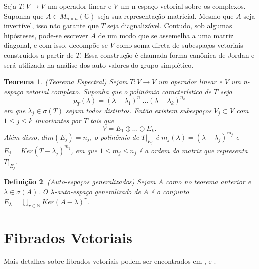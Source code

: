 \documentclass[12pt]{book}
\newtheorem{teorema}{Teorema}[section]
\newtheorem{definicao}[teorema]{Definição}
\newcommand{\complexo}[1]{\mathbb{C}^{#1}}
\newcommand{\matrizquadcomplexa}[1]{M_{#1 \times #1}(\complexo{})}
\begin{document}
	Seja $T:V\to V$ um operador linear e $V$ um n-espaço vetorial sobre os complexos. Suponha que $A \in \matrizquadcomplexa{n}$ seja sua representação matricial. Mesmo que $A$ seja invertível, isso não garante que $T$ seja diagnalizável. Contudo, sob algumas hipósteses, pode-se escrever $A$ de um modo que se assemelha a uma matriz diagonal, e com isso, decompõe-se $V$ como soma direta de subespaços vetoriais construidos a partir de $T$. Essa construção é chamada forma canônica de Jordan e será utilizada na análise dos auto-valores do grupo simplético.
	
	\begin{teorema}\label{teorema_espectral_jordan}
		(Teorema Espectral) Sejam $T:V \to V$ um operador linear e $V$ um n-espaço vetorial complexo. Suponha que o polinômio característico de $T$ seja
		$$
		p_{T}(\lambda) = (\lambda - \lambda_{1})^{n_{1}}\dots (\lambda - \lambda_{k})^{n_{k}}
		$$
		em que $\lambda_{j} \in \sigma(T)$ sejam todos distintos. Então existem subespaços $V_{j} \subset V$ com $1\leq j \leq k$ invariantes por $T$ tais que 
		$$
		V = E_{1}\oplus \dots \oplus E_{k}.
		$$
		Além disso, $dim(E_{j}) = n_{j}$,  o polinômio de $T|_{E_{j}}$ é $m_{j}(\lambda) = (\lambda - \lambda_{j})^{m_{j}}$ e $E_{j} = Ker(T-\lambda_{j})^{m_{j}}$, em que $1\leq m_{j}\leq n_{j}$ é a ordem da matriz que representa $T|_{E_{j}}$.
	\end{teorema}
	
	\begin{definicao}\label{definicao_autoespaco_generalizado}
		(Auto-espaços generalizados) Sejam $A$ como no teorema anterior e $\lambda \in \sigma(A)$. O $\lambda$-auto-espaço generalizado de $A$ é o conjunto $E_{\lambda} = \bigcup_{r \in \mathbb{N}} Ker(A - \lambda)^{r}$.
	\end{definicao}
	
	\chapter{Fibrados Vetoriais}\label{apendice_fibrados}
	
	Mais detalhes sobre fibrados vetoriais podem ser encontrados em \cite{husemoller_fibrados}, \cite{nakahara} e \cite{steenrod_fibre_bundles}.
	
\end{document}
